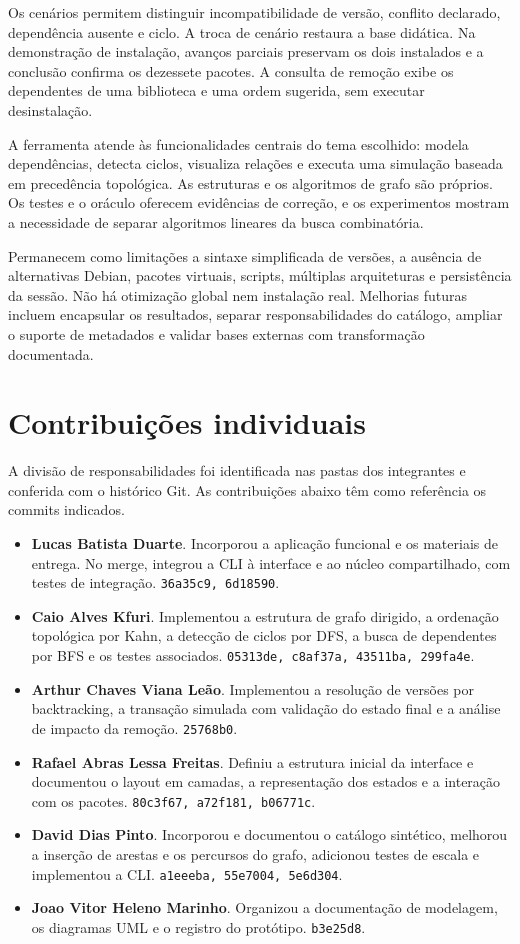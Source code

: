 \documentclass[12pt]{article}
\begin{document}
Os cenários permitem distinguir incompatibilidade de versão, conflito declarado, dependência ausente e ciclo. A troca de cenário restaura a base didática. Na demonstração de instalação, avanços parciais preservam os dois instalados e a conclusão confirma os dezessete pacotes. A consulta de remoção exibe os dependentes de uma biblioteca e uma ordem sugerida, sem executar desinstalação.

A ferramenta atende às funcionalidades centrais do tema escolhido: modela dependências, detecta ciclos, visualiza relações e executa uma simulação baseada em precedência topológica. As estruturas e os algoritmos de grafo são próprios. Os testes e o oráculo oferecem evidências de correção, e os experimentos mostram a necessidade de separar algoritmos lineares da busca combinatória.

Permanecem como limitações a sintaxe simplificada de versões, a ausência de alternativas Debian, pacotes virtuais, scripts, múltiplas arquiteturas e persistência da sessão. Não há otimização global nem instalação real. Melhorias futuras incluem encapsular os resultados, separar responsabilidades do catálogo, ampliar o suporte de metadados e validar bases externas com transformação documentada.

\section{Contribuições individuais}
A divisão de responsabilidades foi identificada nas pastas dos integrantes e conferida com o histórico Git. As contribuições abaixo têm como referência os commits indicados.
\begin{itemize}
\item \textbf{Lucas Batista Duarte}. Incorporou a aplicação funcional e os materiais de entrega. No merge, integrou a CLI à interface e ao núcleo compartilhado, com testes de integração. \texttt{36a35c9, 6d18590}.
\item \textbf{Caio Alves Kfuri}. Implementou a estrutura de grafo dirigido, a ordenação topológica por Kahn, a detecção de ciclos por DFS, a busca de dependentes por BFS e os testes associados. \texttt{05313de, c8af37a, 43511ba, 299fa4e}.
\item \textbf{Arthur Chaves Viana Leão}. Implementou a resolução de versões por backtracking, a transação simulada com validação do estado final e a análise de impacto da remoção. \texttt{25768b0}.
\item \textbf{Rafael Abras Lessa Freitas}. Definiu a estrutura inicial da interface e documentou o layout em camadas, a representação dos estados e a interação com os pacotes. \texttt{80c3f67, a72f181, b06771c}.
\item \textbf{David Dias Pinto}. Incorporou e documentou o catálogo sintético, melhorou a inserção de arestas e os percursos do grafo, adicionou testes de escala e implementou a CLI. \texttt{a1eeeba, 55e7004, 5e6d304}.
\item \textbf{Joao Vitor Heleno Marinho}. Organizou a documentação de modelagem, os diagramas UML e o registro do protótipo. \texttt{b3e25d8}.
\end{itemize}
\end{document}
